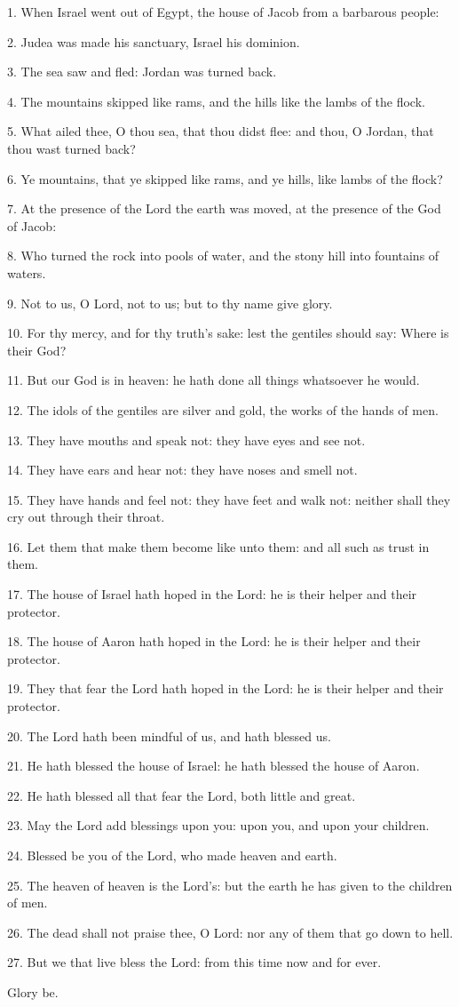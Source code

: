 1. When Israel went out of Egypt, the house of Jacob from a barbarous people:

2. Judea was made his sanctuary, Israel his dominion.

3. The sea saw and fled: Jordan was turned back.

4. The mountains skipped like rams, and the hills like the lambs of the flock.

5. What ailed thee, O thou sea, that thou didst flee: and thou, O Jordan, that thou wast turned back?

6. Ye mountains, that ye skipped like rams, and ye hills, like lambs of the flock?

7. At the presence of the Lord the earth was moved, at the presence of the God of Jacob:

8. Who turned the rock into pools of water, and the stony hill into fountains of waters.

9. Not to us, O Lord, not to us; but to thy name give glory.

10. For thy mercy, and for thy truth's sake: lest the gentiles should say: Where is their God?

11. But our God is in heaven: he hath done all things whatsoever he would.

12. The idols of the gentiles are silver and gold, the works of the hands of men.

13. They have mouths and speak not: they have eyes and see not.

14. They have ears and hear not: they have noses and smell not.

15. They have hands and feel not: they have feet and walk not: neither shall they cry out through their throat.

16. Let them that make them become like unto them: and all such as trust in them.

17. The house of Israel hath hoped in the Lord: he is their helper and their protector.

18. The house of Aaron hath hoped in the Lord: he is their helper and their protector.

19. They that fear the Lord hath hoped in the Lord: he is their helper and their protector.

20. The Lord hath been mindful of us, and hath blessed us.

21. He hath blessed the house of Israel: he hath blessed the house of Aaron.

22. He hath blessed all that fear the Lord, both little and great.

23. May the Lord add blessings upon you: upon you, and upon your children.

24. Blessed be you of the Lord, who made heaven and earth.

25. The heaven of heaven is the Lord's: but the earth he has given to the children of men.

26. The dead shall not praise thee, O Lord: nor any of them that go down to hell.

27. But we that live bless the Lord: from this time now and for ever.

Glory be.
